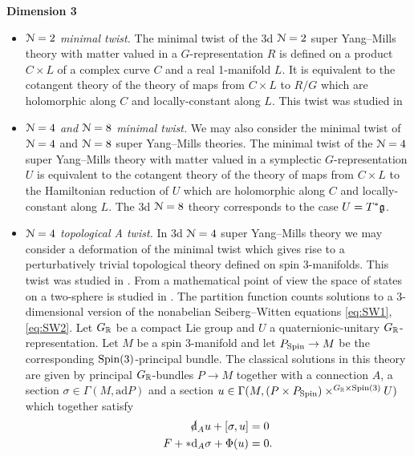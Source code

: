 \documentclass[10pt, oneside]{article}
\begin{document}
\textbf{Dimension 3}
\begin{itemize}
 \item \emph{$\mathcal N=2$ minimal twist.} The minimal twist of the 3d $\mathcal N=2$ super Yang--Mills theory with matter valued in a $G$-representation $R$ is defined on a product $C\times L$ of a complex curve $C$ and a real 1-manifold $L$. It is equivalent to the cotangent theory of the theory of maps from $C\times L$ to $R/G$ which are holomorphic along $C$ and locally-constant along $L$.  This twist was studied in \cite{ACMV}
 
 \item \emph{$\mathcal N=4$ and $\mathcal N=8$ minimal twist.} We may also consider the minimal twist of $\mathcal N=4$ and $\mathcal N=8$ super Yang--Mills theories. The minimal twist of the $\mathcal N=4$ super Yang--Mills theory with matter valued in a symplectic $G$-representation $U$ is equivalent to the cotangent theory of the theory of maps from $C\times L$ to the Hamiltonian reduction of $U$ which are holomorphic along $C$ and locally-constant along $L$. The 3d $\mathcal N=8$ theory corresponds to the case $U=T^*\mathfrak g$.

 \item \emph{$\mathcal{N}=4$ topological A twist.} In 3d $\mathcal N=4$ super Yang--Mills theory we may consider a deformation of the minimal twist which gives rise to a perturbatively trivial topological theory defined on spin 3-manifolds. This twist was studied in \cite{BaulieuGrossman,BlauThompson1,Ohta}. From a mathematical point of view the space of states on a two-sphere is studied in \cite{BFN}. The partition function counts solutions to a 3-dimensional version of the nonabelian Seiberg--Witten equations \eqref{eq:SW1}, \eqref{eq:SW2}. Let $G_\mathbb R$ be a compact Lie group and $U$ a quaternionic-unitary $G_\mathbb R$-representation. Let $M$ be a spin 3-manifold and let $P_{\mathrm{Spin}}\rightarrow M$ be the corresponding $\mathrm{Spin}(3)$-principal bundle. The classical solutions in this theory are given by principal $G_\mathbb R$-bundles $P\rightarrow M$ together with a connection $A$, a section $\sigma\in\Gamma(M, \mathrm{ad} P)$ and a section $u\in\Gamma(M, (P\times P_{\mathrm{Spin}})\times^{G_\mathbb R\times \mathrm{Spin}(3)} U)$ which together satisfy
\begin{align}
\sd \d_A u + [\sigma, u]  &= 0 \label{eq:3dSW1} \\
F + \ast\d_A \sigma + \Phi(u) &= 0. \label{eq:3dSW2}
\end{align}


\end{itemize}
\end{document}
